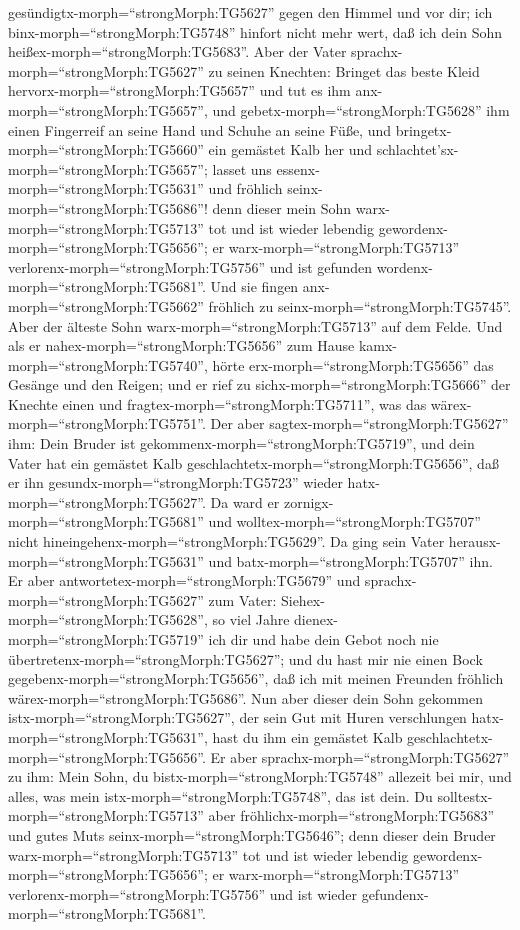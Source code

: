 gesündigtx-morph=``strongMorph:TG5627'' gegen den Himmel und vor dir;
ich binx-morph=``strongMorph:TG5748'' hinfort nicht mehr wert, daß ich
dein Sohn heißex-morph=``strongMorph:TG5683''.  Aber der
Vater sprachx-morph=``strongMorph:TG5627'' zu seinen Knechten: Bringet
das beste Kleid hervorx-morph=``strongMorph:TG5657'' und tut es ihm
anx-morph=``strongMorph:TG5657'', und
gebetx-morph=``strongMorph:TG5628'' ihm einen Fingerreif an seine Hand
und Schuhe an seine Füße,  und
bringetx-morph=``strongMorph:TG5660'' ein gemästet Kalb her und
schlachtet'sx-morph=``strongMorph:TG5657''; lasset uns
essenx-morph=``strongMorph:TG5631'' und fröhlich
seinx-morph=``strongMorph:TG5686''!  denn dieser mein Sohn
warx-morph=``strongMorph:TG5713'' tot und ist wieder lebendig
gewordenx-morph=``strongMorph:TG5656''; er
warx-morph=``strongMorph:TG5713'' verlorenx-morph=``strongMorph:TG5756''
und ist gefunden wordenx-morph=``strongMorph:TG5681''. Und sie fingen
anx-morph=``strongMorph:TG5662'' fröhlich zu
seinx-morph=``strongMorph:TG5745''.  Aber der älteste Sohn
warx-morph=``strongMorph:TG5713'' auf dem Felde. Und als er
nahex-morph=``strongMorph:TG5656'' zum Hause
kamx-morph=``strongMorph:TG5740'', hörte
erx-morph=``strongMorph:TG5656'' das Gesänge und den Reigen;
 und er rief zu sichx-morph=``strongMorph:TG5666'' der
Knechte einen und fragtex-morph=``strongMorph:TG5711'', was das
wärex-morph=``strongMorph:TG5751''.  Der aber
sagtex-morph=``strongMorph:TG5627'' ihm: Dein Bruder ist
gekommenx-morph=``strongMorph:TG5719'', und dein Vater hat ein gemästet
Kalb geschlachtetx-morph=``strongMorph:TG5656'', daß er ihn
gesundx-morph=``strongMorph:TG5723'' wieder
hatx-morph=``strongMorph:TG5627''.  Da ward er
zornigx-morph=``strongMorph:TG5681'' und
wolltex-morph=``strongMorph:TG5707'' nicht
hineingehenx-morph=``strongMorph:TG5629''. Da ging sein Vater
herausx-morph=``strongMorph:TG5631'' und
batx-morph=``strongMorph:TG5707'' ihn.  Er aber
antwortetex-morph=``strongMorph:TG5679'' und
sprachx-morph=``strongMorph:TG5627'' zum Vater:
Siehex-morph=``strongMorph:TG5628'', so viel Jahre
dienex-morph=``strongMorph:TG5719'' ich dir und habe dein Gebot noch nie
übertretenx-morph=``strongMorph:TG5627''; und du hast mir nie einen Bock
gegebenx-morph=``strongMorph:TG5656'', daß ich mit meinen Freunden
fröhlich wärex-morph=``strongMorph:TG5686''.  Nun aber
dieser dein Sohn gekommen istx-morph=``strongMorph:TG5627'', der sein
Gut mit Huren verschlungen hatx-morph=``strongMorph:TG5631'', hast du
ihm ein gemästet Kalb geschlachtetx-morph=``strongMorph:TG5656''.
 Er aber sprachx-morph=``strongMorph:TG5627'' zu ihm: Mein
Sohn, du bistx-morph=``strongMorph:TG5748'' allezeit bei mir, und alles,
was mein istx-morph=``strongMorph:TG5748'', das ist dein. 
Du solltestx-morph=``strongMorph:TG5713'' aber
fröhlichx-morph=``strongMorph:TG5683'' und gutes Muts
seinx-morph=``strongMorph:TG5646''; denn dieser dein Bruder
warx-morph=``strongMorph:TG5713'' tot und ist wieder lebendig
gewordenx-morph=``strongMorph:TG5656''; er
warx-morph=``strongMorph:TG5713'' verlorenx-morph=``strongMorph:TG5756''
und ist wieder gefundenx-morph=``strongMorph:TG5681''.

